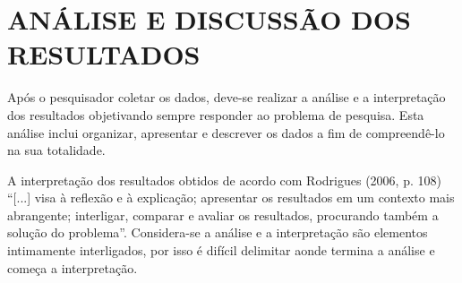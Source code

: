 \chapter{ANÁLISE E DISCUSSÃO DOS RESULTADOS}
\label{resultados}
Após o pesquisador coletar os dados, deve-se realizar a análise e a interpretação dos resultados objetivando sempre responder ao problema de pesquisa. Esta análise inclui organizar, apresentar e descrever os dados a fim de compreendê-lo na sua totalidade. 

A interpretação dos resultados obtidos de acordo com Rodrigues (2006, p. 108) “[...] visa à reflexão e à explicação; apresentar os resultados em um contexto mais abrangente; interligar, comparar e avaliar os resultados, procurando também a solução do problema”. Considera-se a análise e a interpretação são elementos intimamente interligados, por isso é difícil delimitar aonde termina a análise e começa a interpretação.